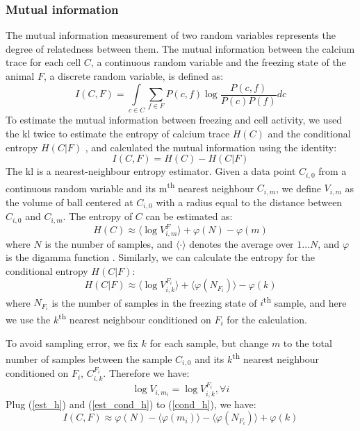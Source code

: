 \subsubsection{Mutual information}

The mutual information measurement of two random variables represents the degree of relatedness between them. The mutual information between the calcium trace for each cell $C$, a continuous random variable and the freezing state of the animal $F$, a discrete random variable, is defined as:
\begin{equation*}
    I(C, F) = \int\limits_{c \in C} \sum_{f \in F} P(c,f)\log\frac{P(c,f)}{P(c)P(f)}dc
\end{equation*}
To estimate the mutual information between freezing and cell activity, we used the \gls{kl} twice to estimate the entropy of calcium trace $H(C)$ and the conditional entropy $H(C|F)$ \citep{ross14, victor02}, and calculated the mutual information using the identity:
\begin{equation} \label{cond_h}
    I(C, F) = H(C) - H(C|F)
\end{equation}
The \gls{kl} is a nearest-neighbour entropy estimator. Given a data point $C_{i,0}$ from a continuous random variable and its m\textsuperscript{th} nearest neighbour $C_{i,m}$, we define $V_{i,m}$ as the volume of ball centered at $C_{i,0}$ with a radius equal to the distance between $C_{i,0}$ and $C_{i,m}$. The entropy of $C$ can be estimated as:
\begin{equation} \label{est_h}
    H(C) \approx \langle \log V_{i,m}^F\rangle + \varphi(N) - \varphi(m)
\end{equation}
where $N$ is the number of samples, and $\langle\cdot\rangle$ denotes the average over $1\ldots N$, and $\varphi$ is the digamma function . Similarly, we can calculate the entropy for the conditional entropy $H(C|F)$:
\begin{equation} \label{est_cond_h}
    H(C|F) \approx \langle \log V_{i,k}^{F_i} \rangle + \langle \varphi(N_{F_i}) \rangle - \varphi(k)
\end{equation}
where $N_{F_i}$ is the number of samples in the freezing state of $i$\textsuperscript{th} sample, and here we use the $k$\textsuperscript{th} nearest neighbour conditioned on $F_i$ for the calculation.

To avoid sampling error, we fix $k$ for each sample, but change $m$ to the total number of samples between the sample $C_{i,0}$ and its $k$\textsuperscript{th} nearest neighbour conditioned on $F_i$, $C_{i,k}^{F_i}$. Therefore we have:
\begin{equation*}
\log V_{i, m_i} = \log V_{i, k}^{F_i}, \forall i 
\end{equation*}
Plug (\ref{est_h}) and (\ref{est_cond_h}) to (\ref{cond_h}), we have:
\begin{equation*}
    I(C, F) \approx \varphi(N) - \langle\varphi(m_i)\rangle - \langle\varphi(N_{F_i})\rangle + \varphi(k)
\end{equation*}





